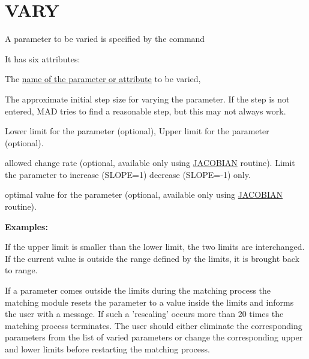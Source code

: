 \section{VARY}
\label{sec:match_vary}
A parameter to be varied is specified by the command 


It has six attributes: 
\begin{madlist}
   The \href{../Introduction/variable.html}{name of the
    parameter or attribute} to be varied,  

   The approximate initial step size for varying the
  parameter. If the step is not entered, MAD tries to find a
  reasonable step, but this may not always work.  

   Lower limit for the parameter (optional), 
   Upper limit for the parameter (optional). 

   allowed change rate (optional, available only using
  \href{match_xeq.html#jacobian}{JACOBIAN} routine). Limit the
  parameter to increase (SLOPE=1) decrease (SLOPE=-1) only.  

   optimal value for the parameter (optional, available
  only using \href{match_xeq.html#jacobian}{JACOBIAN} routine).  
\end{madlist}

{\bf Examples:}

If the upper limit is smaller than the lower limit, the two limits are
interchanged. If the current value is outside the range defined by the
limits, it is brought back to range. 

If a parameter comes outside the
limits during the matching process the matching module resets the
parameter to a value inside the limits and informs the user with a
message. If such a 'rescaling' occurs more than 20 times the matching
process terminates. The user should either eliminate the corresponding
parameters from the list of varied parameters or change the
corresponding upper and lower limits before restarting the matching
process. 

